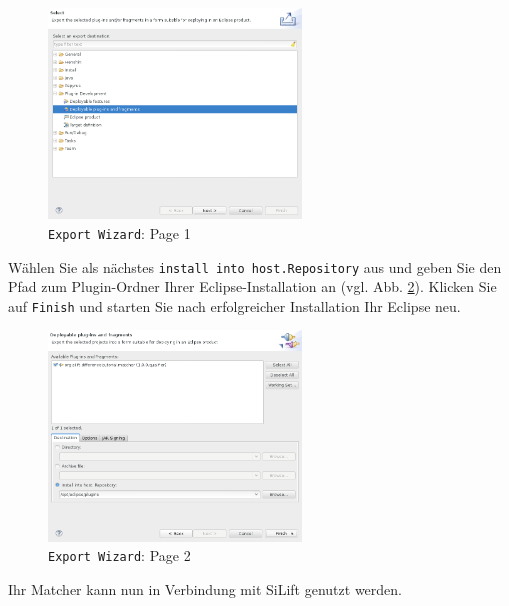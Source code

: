 \begin{figure}[H]
\centering
\includegraphics[width=0.6\textwidth]{matching/graphics/silift-plugin_wizard_deploy01.png}
\caption{\texttt{Export Wizard}: Page 1}
\label{silift-plugin_wizard_deploy01}
\end{figure}

Wählen Sie als nächstes \texttt{install into host.Repository} aus und geben Sie den Pfad zum Plugin-Ordner Ihrer Eclipse-Installation an (vgl. Abb. \ref{silift-plugin_wizard_deploy02}).
Klicken Sie auf \texttt{Finish} und starten Sie nach erfolgreicher Installation Ihr Eclipse neu.

\begin{figure}[H]
\centering
\includegraphics[width=0.6\textwidth]{matching/graphics/silift-plugin_wizard_deploy02.png}
\caption{\texttt{Export Wizard}: Page 2}
\label{silift-plugin_wizard_deploy02}
\end{figure}

Ihr Matcher kann nun in Verbindung mit SiLift genutzt werden.
